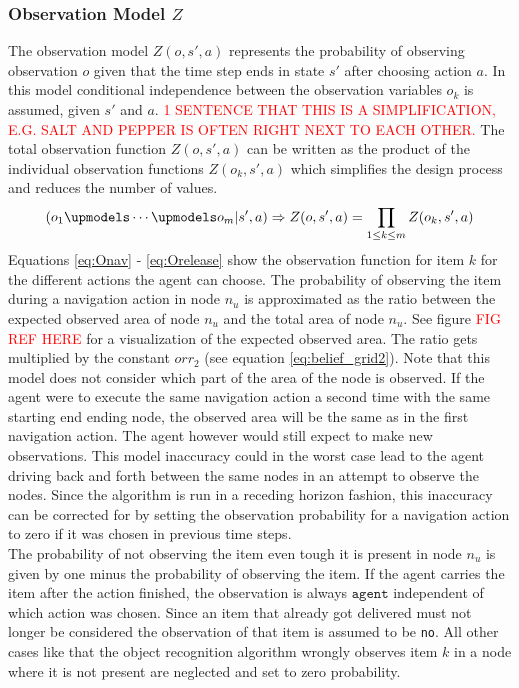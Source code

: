 \subsubsection{Observation Model $Z$}
The observation model $Z(o, s', a)$ represents the probability of observing observation $o$ given that the time step ends in state $s'$ after choosing action $a$. In this model conditional independence between the observation variables $o_k$ is assumed, given $s'$ and $a$. \textcolor{red}{1 SENTENCE THAT THIS IS A SIMPLIFICATION, E.G. SALT AND PEPPER IS OFTEN RIGHT NEXT TO EACH OTHER.} The total observation function $Z(o, s', a)$ can be written as the product of the individual observation functions $Z(o_k, s', a)$ which simplifies the design process and reduces the number of values.
\begin{equation}\label{eq:Ocondind}
    \left(o_1 \upmodels \cdots \upmodels o_m |s', a\right) \Rightarrow Z(o,s',a) = \prod_{1\leq k \leq m}Z(o_k,s',a)
\end{equation}
Equations \ref{eq:Onav} - \ref{eq:Orelease} show the observation function for item $k$ for the different actions the agent can choose. The probability of observing the item during a navigation action in node $n_u$ is approximated as the ratio between the expected observed area of node $n_u$ and the total area of node $n_u$. See figure \textcolor{red}{FIG REF HERE} for a visualization of the expected observed area. The ratio gets multiplied by the constant $orr_2$ (see equation \ref{eq:belief_grid2}). Note that this model does not consider which part of the area of the node is observed. If the agent were to execute the same navigation action a second time with the same starting end ending node, the observed area will be the same as in the first navigation action. The agent however would still expect to make new observations. This model inaccuracy could in the worst case lead to the agent driving back and forth between the same nodes in an attempt to observe the nodes. Since the algorithm is run in a receding horizon fashion, this inaccuracy can be corrected for by setting the observation probability for a navigation action to zero if it was chosen in previous time steps.\\
The probability of not observing the item even tough it is present in node $n_u$ is given by one minus the probability of observing the item. If the agent carries the item after the action finished, the observation is always $\texttt{agent}$ independent of which action was chosen. Since an item that already got delivered must not longer be considered the observation of that item is assumed to be \texttt{no}. All other cases like that the object recognition algorithm wrongly observes item $k$ in a node where it is not present are neglected and set to zero probability. 
